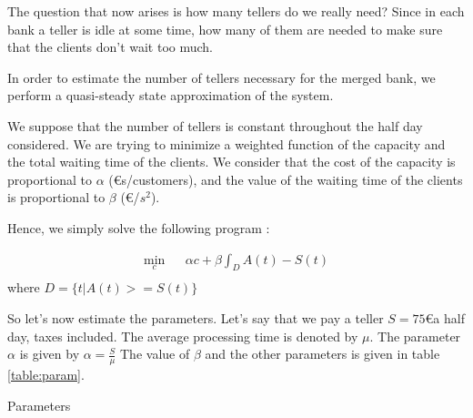 \documentclass[12pt,a4paper,notitlepage]{report}
\begin{document}
The question that now arises is how many tellers do we really need? Since in each bank a teller is idle at some time, how many of them are needed to make sure that the clients don't wait too much.


In order to estimate the number of tellers necessary for the merged bank, we perform a quasi-steady state approximation of the system. 

We suppose that the number of tellers is constant throughout the half day considered.
We are trying to minimize a weighted function of the capacity and the total waiting time of the clients.
We consider that the cost of the capacity is proportional to $ \alpha$ (\euro s/customers), and the value of the waiting time of the clients is proportional to $\beta$ (\euro/$s^2$).

Hence, we simply solve the following program :

\begin{eqnarray*}
\min_c & & \alpha c + \beta \int_D A(t)-S(t)\\
\end{eqnarray*}
where $D = \{t | A(t)>=S(t) \}$

So let's now estimate the parameters. Let's say that we pay a teller $S = 75$\euro  a half day, taxes included.
The average processing time is denoted by $\mu$. 
The parameter $\alpha$ is given by $\alpha = \frac{S}{\mu}$
The value of $\beta$ and the other parameters is given in table \ref{table:param}.
\begin{table}

\caption{Parameters\label{table:param}}
\end{table}
\end{document}
